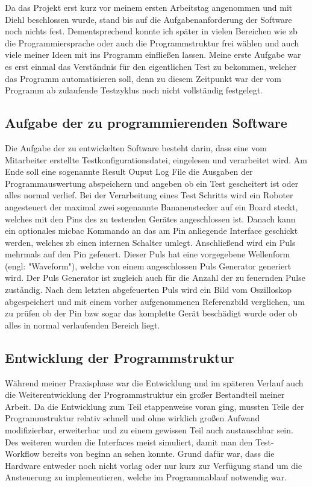 Da das Projekt erst kurz vor meinem ersten Arbeitstag angenommen und mit Diehl beschlossen
wurde, stand bis auf die Aufgabenanforderung der Software noch nichts fest. Dementsprechend
konnte ich später in vielen Bereichen wie \ac{zb} die Programmiersprache oder auch die
Programmstruktur frei wählen und auch viele meiner Ideen mit ins Programm einfließen lassen.
Meine erste Aufgabe war es erst einmal das Verständnis für den eigentlichen Test zu bekommen,
welcher das Programm automatisieren soll, denn zu diesem Zeitpunkt war der vom Programm
ab zulaufende Testzyklus noch nicht vollständig festgelegt. 


\subsection{Aufgabe der zu programmierenden Software}
\label{subsec:aufgabe-software}

Die Aufgabe der zu entwickelten Software besteht darin, dass eine vom Mitarbeiter 
erstellte Testkonfigurationsdatei, eingelesen und verarbeitet wird. Am Ende soll eine 
sogenannte Result Ouput Log File die Ausgaben der Programmauswertung abspeichern und 
angeben ob ein Test gescheitert ist oder alles normal verlief.
Bei der Verarbeitung eines Test Schritts wird ein Roboter angesteuert der maximal zwei
sogenannte Bananenstecker auf ein Board steckt, welches mit den Pins des zu testenden 
Gerätes angeschlossen ist. Danach kann ein optionales \ac{micbac} Kommando an das am Pin 
anliegende Interface geschickt werden, welches \ac{zb} einen internen Schalter umlegt. 
Anschließend wird ein Puls mehrmals auf den Pin gefeuert. Dieser Puls hat eine vorgegebene 
Wellenform (engl: "Waveform"), welche von einem angeschlossen Puls Generator generiert 
wird. Der Puls Generator ist zugleich auch für die Anzahl der zu feuernden Pulse 
zuständig. Nach dem letzten abgefeuerten Puls wird ein Bild vom Oszilloskop abgespeichert 
und mit einem vorher aufgenommenen Referenzbild verglichen, um zu prüfen ob der Pin 
\ac{bzw} sogar das komplette Gerät beschädigt wurde oder ob alles in normal verlaufenden 
Bereich liegt. 


\subsection{Entwicklung der Programmstruktur}
\label{subsec:entw-prgstr}

Während meiner Praxisphase war die Entwicklung und im späteren Verlauf auch die
Weiterentwicklung der Programmstruktur ein großer Bestandteil meiner Arbeit. Da die 
Entwicklung zum Teil etappenweise voran ging, mussten Teile der Programmstruktur relativ 
schnell und ohne wirklich großen Aufwand modifizierbar, erweiterbar und zu einem gewissen 
Teil auch austauschbar sein. Des weiteren wurden die Interfaces meist simuliert, damit man den Test-Workflow bereits von beginn an sehen konnte. Grund dafür war, dass die Hardware entweder noch nicht vorlag oder nur kurz zur Verfügung stand um die Ansteuerung zu implementieren, welche im Programmablauf notwendig war.


